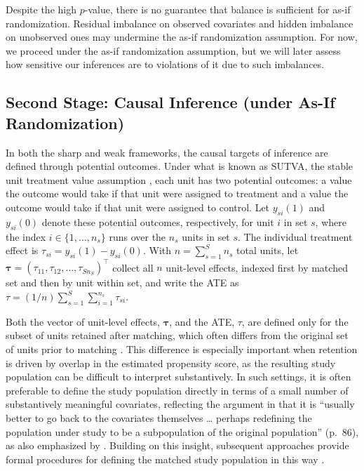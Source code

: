 \documentclass[twoside,11pt]{article}
\begin{document}
Despite the high \(p\)-value, there is no guarantee that balance is
sufficient for as-if randomization. Residual imbalance on observed
covariates and hidden imbalance on unobserved ones may undermine the
as-if randomization assumption. For now, we proceed under the as-if
randomization assumption, but we will later assess how sensitive our
inferences are to violations of it due to such imbalances.

\subsection{Second Stage: Causal Inference (under As-If
Randomization)}\label{part-2-causal-inference-under-as-if-randomization}

In both the sharp and weak frameworks, the causal targets of inference
are defined through potential outcomes. Under what is known as SUTVA,
the stable unit treatment value assumption
\citep{rubin1980, rubin1986, cox1958}, each unit has two potential
outcomes: a value the outcome would take if that unit were assigned to
treatment and a value the outcome would take if that unit were assigned
to control. Let \(y_{si}(1)\) and \(y_{si}(0)\) denote these potential
outcomes, respectively, for unit \(i\) in set \(s\), where the index
\(i \in \{1, \ldots, n_s\}\) runs over the \(n_s\) units in set \(s\). The
individual treatment effect is \(\tau_{si} = y_{si}(1) - y_{si}(0)\).
With \(n = \sum_{s = 1}^S n_s\) total units, let
\(\bm{\tau} = (\tau_{11}, \tau_{12}, \ldots, \tau_{Sn_S})^{\top}\)
collect all \(n\) unit-level effects, indexed first by matched set and
then by unit within set, and write the ATE as
\(\tau = (1/n) \sum_{s=1}^S \sum_{i=1}^{n_s} \tau_{si}\).

Both the vector of unit-level effects, \(\bm{\tau}\), and the ATE,
\(\tau\), are defined only for the subset of units
retained after matching, which often differs from the original set of
units prior to matching \citep{rosenbaumrubin1985, rosenbaum2012}. This
difference is especially important when retention is driven by overlap
in the estimated propensity score, as the resulting study population can
be difficult to interpret substantively. In such settings, it is often
preferable to define the study population directly in terms of a small
number of substantively meaningful covariates, reflecting the argument
in \citet{rosenbaum2010} that it is ``usually better to go back to the
covariates themselves \ldots{} perhaps redefining the population under
study to be a subpopulation of the original population'' (p.~86), as
also emphasized by \citet{stuart2010}. Building on this insight,
subsequent approaches provide formal procedures for defining the
matched study population in this way
\citep{fogartyetal2016, traskinsmall2011}.
\end{document}
